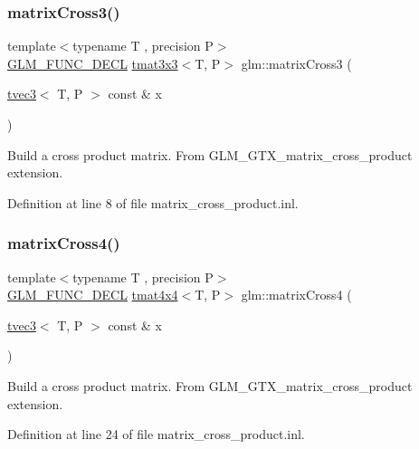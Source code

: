 \subsubsection{\texorpdfstring{matrixCross3()}{matrixCross3()}}
{\footnotesize\ttfamily template$<$typename T , precision P$>$ \\
\mbox{\hyperlink{setup_8hpp_ab2d052de21a70539923e9bcbf6e83a51}{G\+L\+M\+\_\+\+F\+U\+N\+C\+\_\+\+D\+E\+CL}} \mbox{\hyperlink{structglm_1_1tmat3x3}{tmat3x3}}$<$T, P$>$ glm\+::matrix\+Cross3 (\begin{DoxyParamCaption}\item[{\mbox{\hyperlink{structglm_1_1tvec3}{tvec3}}$<$ T, P $>$ const \&}]{x }\end{DoxyParamCaption})}

Build a cross product matrix. From G\+L\+M\+\_\+\+G\+T\+X\+\_\+matrix\+\_\+cross\+\_\+product extension. 

Definition at line 8 of file matrix\+\_\+cross\+\_\+product.\+inl.

\mbox{\label{group__gtx__matrix__cross__product_ga2d46cc5253761c214aa5c782865156b1}} 
\subsubsection{\texorpdfstring{matrixCross4()}{matrixCross4()}}
{\footnotesize\ttfamily template$<$typename T , precision P$>$ \\
\mbox{\hyperlink{setup_8hpp_ab2d052de21a70539923e9bcbf6e83a51}{G\+L\+M\+\_\+\+F\+U\+N\+C\+\_\+\+D\+E\+CL}} \mbox{\hyperlink{structglm_1_1tmat4x4}{tmat4x4}}$<$T, P$>$ glm\+::matrix\+Cross4 (\begin{DoxyParamCaption}\item[{\mbox{\hyperlink{structglm_1_1tvec3}{tvec3}}$<$ T, P $>$ const \&}]{x }\end{DoxyParamCaption})}

Build a cross product matrix. From G\+L\+M\+\_\+\+G\+T\+X\+\_\+matrix\+\_\+cross\+\_\+product extension. 

Definition at line 24 of file matrix\+\_\+cross\+\_\+product.\+inl.

